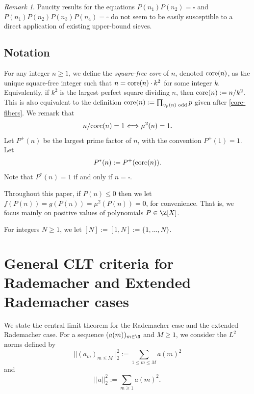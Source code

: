\documentclass[reqno, 12pt]{amsart}
\theoremstyle{plain}
\theoremstyle{definition}
\theoremstyle{remark}
\newtheorem*{remark}{Remark}
\renewcommand{\le}{\leqslant}
\renewcommand{\ge}{\geqslant}
\newcommand{\co}{\textnormal{core}}
\begin{document}
\begin{remark}
Paucity results for the equations
$P(n_1)P(n_2) = \square$ and $P(n_1)P(n_2)P(n_3)P(n_4) = \square$
do not seem to be easily susceptible to
a direct application of
existing upper-bound sieves.
\end{remark}

\subsection*{Notation}

For any integer $n \ge 1$, we define the \emph{square-free core} of $n$, denoted $\co(n)$, as the unique square-free integer such that $n = \co(n) \cdot k^2$ for some integer $k$.
Equivalently, if $k^2$ is the largest perfect square dividing $n$,
then $\co(n) := n/k^2$.
This is also equivalent to the definition
$\co(n) := \prod_{v_p(n)\textnormal{ odd}} p$
given after \eqref{core-fibers}.
We remark that
$$n/\co(n)=1 \Longleftrightarrow   \mu^2(n)=1.$$
Let $P^+(n)$ be the largest prime factor of $n$, with the convention $P^+(1)=1$.
Let \begin{equation}
    \label{def P*}
P^*(n) := P^+(\textnormal{core}(n)).\end{equation}
Note that $P^*(n) = 1$ if and only if $n = \square$.

Throughout this paper,
if $P(n)\le 0$ then we let $f(P(n))=g(P(n))=\mu^2(P(n))=0$,
for convenience.
That is, we focus mainly on positive values of polynomials $P\in \Z[X]$.

For integers $N\ge 1$, we let $[N] := [1,N] := \{ 1,\ldots, N\}$.

\section{General CLT criteria for Rademacher and Extended Rademacher cases}
\label{general-clt}

We state the central limit theorem for the Rademacher case and the extended Rademacher case.
For a sequence $(a(m))_{m\in \N}$ and $M\ge 1$, we consider
 the $L^2$ norms
defined by 
$$|| (a_m)_{m\le M} ||_2^2:=\sum_{1\le m\le M} a(m)^{2} $$
and
$$|| a||_2^2:=\sum_{  m\ge 1} a(m)^{2}.$$
\end{document}
